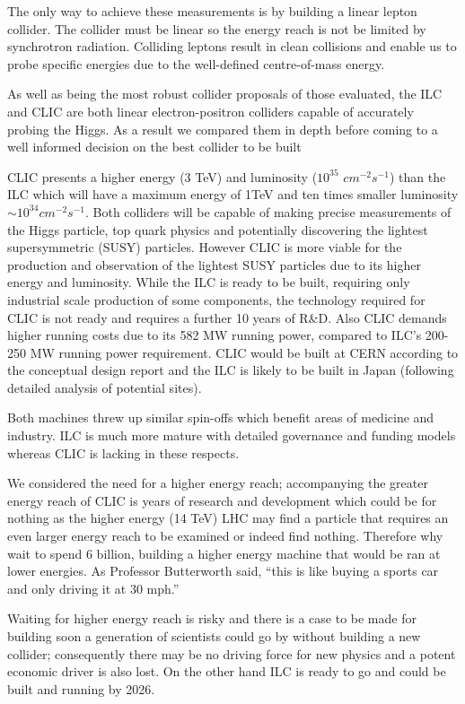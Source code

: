 The only way to achieve these measurements is by building a linear lepton collider. The collider must be linear so the energy reach is not be limited by synchrotron radiation. Colliding leptons result in clean collisions and enable us to probe specific energies due to the well-defined centre-of-mass energy.

As well as being the most robust collider proposals of those evaluated, the ILC and CLIC are both linear electron-positron colliders capable of accurately probing the Higgs. As a result we compared them in depth before coming to a well informed decision on the best collider to be built

CLIC presents a higher energy (3 TeV) and luminosity ($10^{35}$ $cm^{-2} s^{-1}$) than the ILC which will have a maximum energy of 1TeV and ten times smaller luminosity $\sim10^{34} cm^{-2} s^{-1}$. Both colliders will be capable of making precise measurements of the Higgs particle, top quark physics and potentially discovering the lightest supersymmetric (SUSY) particles. However CLIC is more viable for the production and observation of the lightest SUSY particles due to its higher energy and luminosity. While the ILC is ready to be built, requiring only industrial scale production of some components, the technology required for CLIC is not ready and requires a further 10 years of R\&D. Also CLIC demands higher running costs due to its 582 MW running power, compared to ILC's 200-250 MW running power requirement. CLIC would be built at CERN according to the conceptual design report and the ILC is likely to be built in Japan (following detailed analysis of potential sites).  

Both machines threw up similar spin-offs which benefit areas of medicine and industry. ILC is much more mature with detailed governance and funding models whereas CLIC is lacking in these respects.

We considered the need for a higher energy reach; accompanying the greater energy reach of CLIC is years of research and development which could be for nothing as the higher energy (14 TeV) LHC may find a particle that requires an even larger energy reach to be examined or indeed find nothing. Therefore why wait to spend 6 billion, building a higher energy machine that would be ran at lower energies. As Professor Butterworth said, ``this is like buying a sports car and only driving it at 30 mph.'' \cite{Butterworth:Interview}

Waiting for higher energy reach is risky and there is a case to be made for building soon \textendash a generation of scientists could go by without building a new collider; consequently there may be no driving force for new physics and a potent economic driver is also lost. On the other hand ILC is ready to go and could be built and running by 2026.

